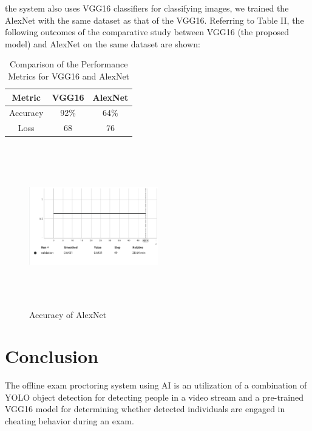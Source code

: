 \documentclass[conference]{IEEEtran}
\begin{document}
the system also uses VGG16 classifiers for classifying images, we trained the  AlexNet with the same dataset as that of the VGG16. Referring to Table II, the following outcomes of the comparative study between VGG16 (the proposed model) and AlexNet on the same dataset are shown:
\begin{table}[htbp]
\caption{Comparison of the Performance Metrics for VGG16 and AlexNet}
\label{tab2} %
\begin{center}
\begin{tabular}{|c|c|c|}
\hline
\textbf{Metric} & \textbf{VGG16} & \textbf{AlexNet} \\ %
\hline
Accuracy & 92\% & 64\%\\ %

\hline
Loss&68&76\\
\hline

\end{tabular}
\end{center}
\end{table}



\begin{figure}[htbp]
\centering
\includegraphics[width=0.5\textwidth, height=7cm]{images/AlexNet.png}  
\caption{Accuracy of AlexNet}
\label{fig}
\end{figure}



\section{Conclusion}
The offline exam proctoring system using AI is an utilization of a combination of YOLO object detection for detecting people in a video stream and a pre-trained VGG16 model for determining whether detected individuals are engaged in cheating behavior during an exam.
\end{document}
